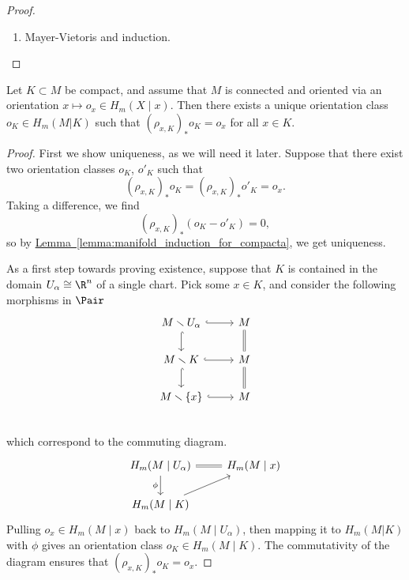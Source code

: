 \documentclass[main.tex]{subfiles}
\begin{document}
\begin{proof}
\begin{enumerate}
    \item Mayer-Vietoris and induction.
  \end{enumerate}
\end{proof}

\begin{proposition}
  \label{prop:orientation_class_for_compacta}
  Let \(K \subset M\) be compact, and assume that \(M\) is connected and oriented via an orientation \(x \mapsto o_{x} \in H_{m}(X \mid x)\). Then there exists a unique orientation class \(o_{K} \in H_{m}(M | K)\) such that \((\rho_{x, K})_{*}o_{K} = o_{x}\) for all \(x \in K\).
\end{proposition}
\begin{proof}
  First we show uniqueness, as we will need it later. Suppose that there exist two orientation classes \(o_{K}\), \(o'_{K}\) such that
  \begin{equation*}
    (\rho_{x, K})_{*}o_{K} = (\rho_{x, K})_{*}o'_{K} = o_{x}.
  \end{equation*}
  Taking a difference, we find
  \begin{equation*}
    (\rho_{x, K})_{*}(o_{K} - o'_{K}) = 0,
  \end{equation*}
  so by \hyperref[lemma:manifold_induction_for_compacta]{Lemma~\ref*{lemma:manifold_induction_for_compacta}}, we get uniqueness.

  As a first step towards proving existence, suppose that \(K\) is contained in the domain \(U_{\alpha} \cong \R^{n}\) of a single chart. Pick some \(x \in K\), and consider the following morphisms in \(\Pair\)
  \begin{equation*}
    \begin{tikzcd}
      M \smallsetminus U_{\alpha}
      \arrow[r, hook]
      \arrow[d, hook]
      & M
      \arrow[d, equals]
      \\
      M \smallsetminus K
      \arrow[r, hook]
      \arrow[d, hook]
      & M
      \arrow[d, equals]
      \\
      M \smallsetminus \{x\}
      \arrow[r, hook]
      & M
      \\
    \end{tikzcd}
  \end{equation*}
  which correspond to the commuting diagram.
  \begin{equation*}
    \begin{tikzcd}
      H_{m}(M \mid U_{\alpha})
      \arrow[r, equals]
      \arrow[d, swap, "\phi"]
      & H_{m}(M \mid x)
      \\
      H_{m}(M \mid K)
      \arrow[ur]
    \end{tikzcd}
  \end{equation*}
  Pulling \(o_{x} \in H_{m}(M \mid x)\) back to \(H_{m}(M \mid U_{\alpha})\), then mapping it to \(H_{m}(M | K)\) with \(\phi\) gives an orientation class \(o_{K} \in H_{m}(M \mid K)\). The commutativity of the diagram ensures that \((\rho_{x, K})_{*}o_{K} = o_{x}\).


\end{proof}
\end{document}
